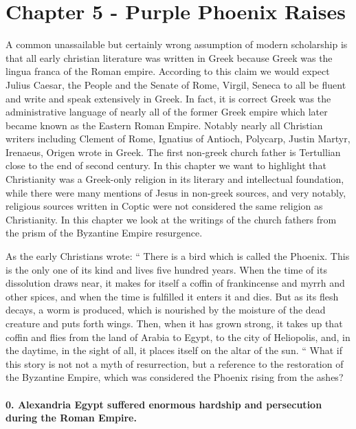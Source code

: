 \section{Chapter 5 - Purple Phoenix Raises}\label{par:chapter-5---purple-phoenix-raises}

A common unassailable but certainly wrong assumption of modern scholarship is that all early christian literature was written in Greek because Greek was the lingua franca of the Roman empire.
According to this claim we would expect Julius Caesar, the People and the Senate of Rome, Virgil, Seneca to all be fluent and write and speak extensively in Greek.
In fact, it is correct Greek was the administrative language of nearly all of the former Greek empire which later became known as the Eastern Roman Empire.
Notably nearly all Christian writers including Clement of Rome, Ignatius of Antioch, Polycarp, Justin Martyr, Irenaeus, Origen wrote in Greek.
The first non-greek church father is Tertullian close to the end of second century.
In this chapter we want to highlight that Christianity was a Greek-only religion in its literary and intellectual foundation, while there were many mentions of Jesus in non-greek sources, and very notably, religious sources written in Coptic were not considered the same religion as Christianity.
In this chapter we look at the writings of the church fathers from the prism of the Byzantine Empire resurgence.

As the early Christians wrote:
``
There is a bird which is called the Phoenix.
This is the only one of its kind and lives five hundred years.
When the time of its dissolution draws near, it makes for itself a coffin of frankincense and myrrh and other spices, and when the time is fulfilled it enters it and dies.
But as its flesh decays, a worm is produced, which is nourished by the moisture of the dead creature and puts forth wings.
Then, when it has grown strong, it takes up that coffin and flies from the land of Arabia to Egypt, to the city of Heliopolis, and, in the daytime, in the sight of all, it places itself on the altar of the sun.
``
What if this story is not not a myth of resurrection, but a reference to the restoration of the Byzantine Empire, which was considered the Phoenix rising from the ashes?

\paragraph{0.
Alexandria Egypt suffered enormous hardship and persecution during the Roman Empire.}\label{par:alexandria-egypt-suffered-enormous-hardship-and-persecution-during-the-roman-empire.}


